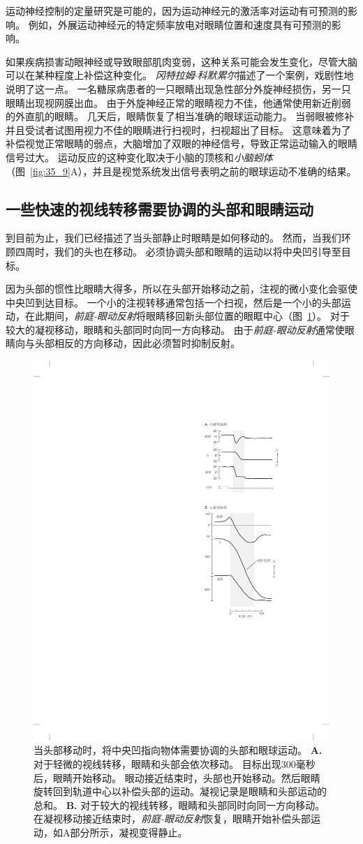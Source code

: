 运动神经控制的定量研究是可能的，因为运动神经元的激活率对运动有可预测的影响。
例如，外展运动神经元的特定频率放电对眼睛位置和速度具有可预测的影响。


如果疾病损害动眼神经或导致眼部肌肉变弱，这种关系可能会发生变化，尽管大脑可以在某种程度上补偿这种变化。
\textit{冈特拉姆$\cdot$科默累尔}描述了一个案例，戏剧性地说明了这一点。
一名糖尿病患者的一只眼睛出现急性部分外旋神经损伤，另一只眼睛出现视网膜出血。
由于外旋神经正常的眼睛视力不佳，他通常使用新近削弱的外直肌的眼睛。
几天后，眼睛恢复了相当准确的眼球运动能力。
当弱眼被修补并且受试者试图用视力不佳的眼睛进行扫视时，扫视超出了目标。
这意味着为了补偿视觉正常眼睛的弱点，大脑增加了双眼的神经信号，导致正常运动输入的眼睛信号过大。
运动反应的这种变化取决于小脑的顶核和\textit{小脑蚓体}（图~\ref{fig:35_9}A），并且是视觉系统发出信号表明之前的眼球运动不准确的结果。



\subsection{一些快速的视线转移需要协调的头部和眼睛运动}

到目前为止，我们已经描述了当头部静止时眼睛是如何移动的。
然而，当我们环顾四周时，我们的头也在移动。
必须协调头部和眼睛的运动以将中央凹引导至目标。


因为头部的惯性比眼睛大得多，所以在头部开始移动之前，注视的微小变化会驱使中央凹到达目标。
一个小的注视转移通常包括一个扫视，然后是一个小的头部运动，在此期间，\textit{前庭-眼动反射}将眼睛移回新头部位置的眼眶中心（图~\ref{fig:35_14}）。
对于较大的凝视移动，眼睛和头部同时向同一方向移动。
由于\textit{前庭-眼动反射}通常使眼睛向与头部相反的方向移动，因此必须暂时抑制反射。


\begin{figure}[htbp]
	\centering
	\includegraphics[width=0.5\linewidth]{chap35/fig_35_14}
	\caption{当头部移动时，将中央凹指向物体需要协调的头部和眼球运动。
		\textbf{A.} 对于轻微的视线转移，眼睛和头部会依次移动。
		目标出现300毫秒后，眼睛开始移动。
		眼动接近结束时，头部也开始移动。然后眼睛旋转回到轨道中心以补偿头部的运动。凝视记录是眼睛和头部运动的总和\cite{zee1977disorders}。
		\textbf{B.} 对于较大的视线转移，眼睛和头部同时向同一方向移动。
		在凝视移动接近结束时，\textit{前庭-眼动反射}恢复，眼睛开始补偿头部运动，如A部分所示，凝视变得静止\cite{laurutis1986vestibulo}。}
	\label{fig:35_14}
\end{figure}



